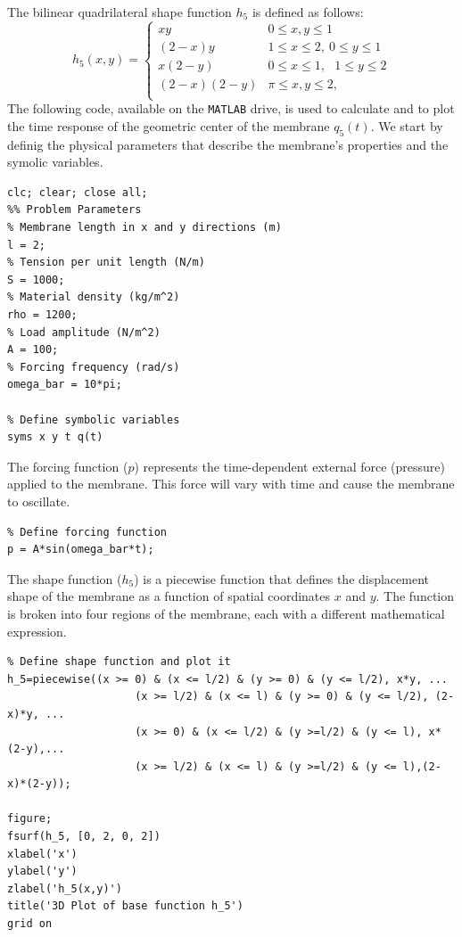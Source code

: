 \documentclass[12pt]{article}
\begin{document}
The bilinear quadrilateral shape function $h_5$ is defined as follows:
$$h_5(x,y)=\begin{cases}
        xy         & 0\leq x,y\leq 1                                   \\
        (2-x)y     & 1\leq x\leq 2,     \                0\leq y\leq 1 \\
        x(2-y)     & 0\leq x\leq 1,\ \ \ 1\leq y\leq 2                 \\
        (2-x)(2-y) & \pi\leq x,y\leq 2,                                \\
    \end{cases}$$
The following code, available on the \texttt{MATLAB} drive, is used to calculate and to plot the time response of the geometric center of the membrane $q_5(t)$. We start by definig the physical parameters that describe the membrane's properties and the symolic variables.
\begin{verbatim}
clc; clear; close all;
%% Problem Parameters
% Membrane length in x and y directions (m)
l = 2;  
% Tension per unit length (N/m)
S = 1000;  
% Material density (kg/m^2)
rho = 1200; 
% Load amplitude (N/m^2)
A = 100;   
% Forcing frequency (rad/s)
omega_bar = 10*pi; 
    
% Define symbolic variables
syms x y t q(t)
\end{verbatim}
The forcing function ($p$) represents the time-dependent external force (pressure) applied to the membrane. This force will vary with time and cause the membrane to oscillate.
\begin{verbatim}
% Define forcing function
p = A*sin(omega_bar*t);
\end{verbatim}
The shape function ($h_5$) is a piecewise function that defines the displacement shape of the membrane as a function of spatial coordinates $x$ and $y$. The function is broken into four regions of the membrane, each with a different mathematical expression.
\begin{verbatim}
% Define shape function and plot it 
h_5=piecewise((x >= 0) & (x <= l/2) & (y >= 0) & (y <= l/2), x*y, ...
                    (x >= l/2) & (x <= l) & (y >= 0) & (y <= l/2), (2-x)*y, ...
                    (x >= 0) & (x <= l/2) & (y >=l/2) & (y <= l), x*(2-y),...
                    (x >= l/2) & (x <= l) & (y >=l/2) & (y <= l),(2-x)*(2-y));
    
figure;
fsurf(h_5, [0, 2, 0, 2])
xlabel('x')
ylabel('y')
zlabel('h_5(x,y)')
title('3D Plot of base function h_5')
grid on
\end{verbatim}
\end{document}
